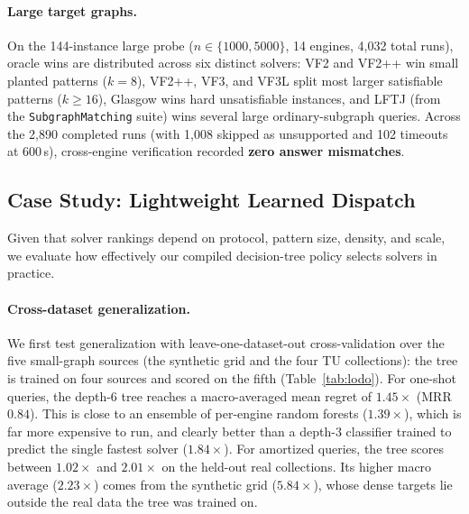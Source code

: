 \documentclass[11pt,a4paper]{article}
\begin{document}
\paragraph{Large target graphs.} On the 144-instance large probe ($n \in \{1000, 5000\}$, 14 engines, 4,032 total runs), oracle wins are distributed across six distinct solvers: VF2 and VF2++ win small planted patterns ($k=8$), VF2++, VF3, and VF3L split most larger satisfiable patterns ($k \ge 16$), Glasgow wins hard unsatisfiable instances, and LFTJ (from the \texttt{SubgraphMatching} suite) wins several large ordinary-subgraph queries. Across the 2,890 completed runs (with 1,008 skipped as unsupported and 102 timeouts at 600\,s), cross-engine verification recorded \textbf{zero answer mismatches}.

\subsection{Case Study: Lightweight Learned Dispatch}

Given that solver rankings depend on protocol, pattern size, density, and scale, we evaluate how effectively our compiled decision-tree policy selects solvers in practice.

\paragraph{Cross-dataset generalization.} We first test generalization with leave-one-dataset-out cross-validation over the five small-graph sources (the synthetic grid and the four TU collections): the tree is trained on four sources and scored on the fifth (Table~\ref{tab:lodo}). For one-shot queries, the depth-6 tree reaches a macro-averaged mean regret of $1.45\times$ (MRR $0.84$). This is close to an ensemble of per-engine random forests ($1.39\times$), which is far more expensive to run, and clearly better than a depth-3 classifier trained to predict the single fastest solver ($1.84\times$). For amortized queries, the tree scores between $1.02\times$ and $2.01\times$ on the held-out real collections. Its higher macro average ($2.23\times$) comes from the synthetic grid ($5.84\times$), whose dense targets lie outside the real data the tree was trained on.
\end{document}
